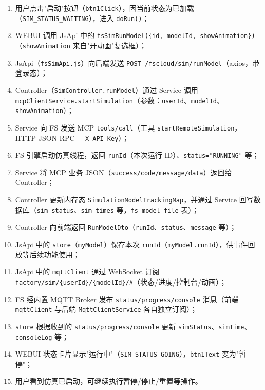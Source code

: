 \begin{enumerate}[label=\arabic*)]
	\item 用户点击"启动"按钮（\texttt{btn1Click}），因当前状态为已加载（\texttt{SIM\_STATUS\_WAITING}），进入 \texttt{doRun()}；
	\item WEBUI 调用 JsApi 中的 \texttt{fsSimRunModel(\{id, modelId, showAnimation\})}（\texttt{showAnimation} 来自"开动画"复选框）；
	\item JsApi（\texttt{fsSimApi.js}）向后端发送 \texttt{POST /fscloud/sim/runModel}（axios，带登录态）；
	\item Controller（\texttt{SimController.runModel}）通过 Service 调用 \texttt{mcpClientService.startSimulation}（参数：\texttt{userId}、\texttt{modelId}、\texttt{showAnimation}）；
	\item Service 向 FS 发送 MCP \texttt{tools/call}（工具 \texttt{startRemoteSimulation}，HTTP JSON-RPC + \texttt{X-API-Key}）；
	\item FS 引擎启动仿真线程，返回 \texttt{runId}（本次运行 ID）、\texttt{status="RUNNING"} 等；
	\item Service 将 MCP 业务 JSON（\texttt{success/code/message/data}）返回给 Controller；
	\item Controller 更新内存态 \texttt{SimulationModelTrackingMap}，并通过 Service 回写数据库（\texttt{sim\_status}、\texttt{sim\_times} 等，\texttt{fs\_model\_file} 表）；
	\item Controller 向前端返回 \texttt{RunModelDto}（\texttt{runId}、\texttt{status}、\texttt{message} 等）；
	\item JsApi 中的 \texttt{store}（\texttt{myModel}）保存本次 \texttt{runId}（\texttt{myModel.runId}），供事件回放等后续功能使用；
	\item JsApi 中的 \texttt{mqttClient} 通过 WebSocket 订阅 \texttt{factory/sim/\{userId\}/\{modelId\}/\#}（状态/进度/控制台/动画）；
	\item FS 经内置 MQTT Broker 发布 \texttt{status/progress/console} 消息（前端 \texttt{mqttClient} 与后端 \texttt{MqttClientService} 各自独立订阅）；
	\item \texttt{store} 根据收到的 \texttt{status/progress/console} 更新 \texttt{simStatus}、\texttt{simTime}、\texttt{consoleLog} 等；
	\item WEBUI 状态卡片显示"运行中"（\texttt{SIM\_STATUS\_GOING}），\texttt{btn1Text} 变为"暂停"；
	\item 用户看到仿真已启动，可继续执行暂停/停止/重置等操作。
\end{enumerate}
\newpage
